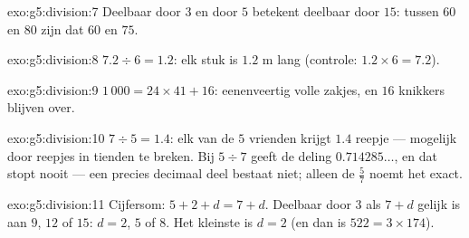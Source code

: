 \begin{solution}{exo:g5:division:7}
Deelbaar door $3$ en door $5$ betekent deelbaar door $15$: tussen $60$ en
$80$ zijn dat $60$ en $75$.
\end{solution}

\begin{solution}{exo:g5:division:8}
$7.2 \div 6 = 1.2$: elk stuk is $1.2$ m lang (controle:
$1.2 \times 6 = 7.2$).
\end{solution}

\begin{solution}{exo:g5:division:9}
$1\,000 = 24 \times 41 + 16$: eenenveertig volle zakjes, en $16$ knikkers
blijven over.
\end{solution}

\begin{solution}{exo:g5:division:10}
$7 \div 5 = 1.4$: elk van de $5$ vrienden krijgt $1.4$ reepje --- mogelijk
door reepjes in tienden te breken. Bij $5 \div 7$ geeft de deling
$0.714285\dots$, en dat stopt nooit --- een precies decimaal deel bestaat
niet; alleen de  $\frac57$ noemt het exact.
\end{solution}

\begin{solution}{exo:g5:division:11}
Cijfersom: $5 + 2 + d = 7 + d$. Deelbaar door $3$ als $7 + d$ gelijk is aan
$9$, $12$ of $15$: $d = 2$, $5$ of $8$. Het kleinste is $d = 2$ (en dan is
$522 = 3 \times 174$).
\end{solution}
